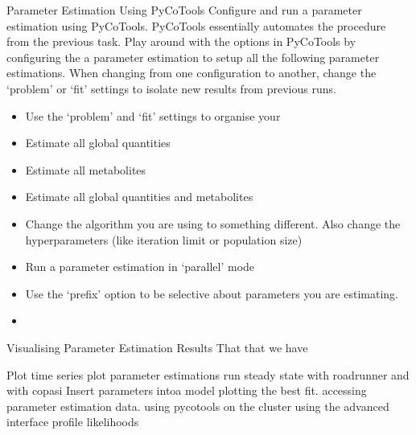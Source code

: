 \documentclass[../../main]{subfiles}
\begin{document}
\begin{Task}[label=AutoParameterEstimation]{Parameter Estimation Using PyCoTools}
    Configure and run a parameter estimation using PyCoTools. PyCoTools essentially automates the procedure
    from the previous task.
    Play around with the options in PyCoTools by configuring the a parameter estimation to setup all the following
    parameter estimations. When changing from one configuration to another, change the `problem' or `fit' settings
    to isolate new results from previous runs.

    \begin{itemize}
        \item Use the `problem' and `fit' settings to organise your
        \item Estimate all global quantities
        \item Estimate all metabolites
        \item Estimate all global quantities and metabolites
        \item Change the algorithm you are using to something different. Also change the hyperparameters (like iteration limit or population size)
        \item Run a parameter estimation in `parallel' mode
        \item Use the `prefix' option to be selective about parameters you are estimating.
        \item {}
    \end{itemize}
\end{Task}

\begin{Task}[label=VizPE]{Visualising Parameter Estimation Results}
    That that we have

\end{Task}
    Plot time series
    plot parameter estimations
    run steady state with roadrunner and with copasi
    Insert parameters intoa model
    plotting the best fit.
    accessing parameter estimation data.
    using pycotools on the cluster
    using the advanced interface
    profile likelihoods
\end{document}
